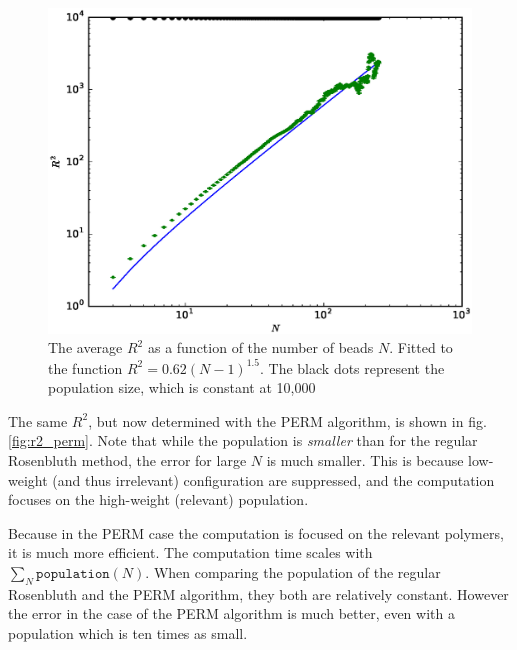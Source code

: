 \documentclass[a4paper,twocolumn]{article}
\def\code#1{\texttt{#1}}
\begin{document}
\begin{figure}
	\centering
	\includegraphics[width=\linewidth]{r2_noperm_10000run.eps}
	\caption{The average $R^2$ as a function of the number of beads $N$. Fitted to the function $R^2 = 0.62(N-1)^{1.5}$. The black dots represent the population size, which is constant at 10,000}
	\label{fig:r2_noperm}
\end{figure}

The same $R^2$, but now determined with the PERM algorithm, is shown in fig. \ref{fig:r2_perm}. Note that while the population is \emph{smaller} than for the regular Rosenbluth method, the error for large $N$ is much smaller. This is because low-weight (and thus irrelevant) configuration are suppressed, and the computation focuses on the high-weight (relevant) population.

Because in the PERM case the computation is focused on the relevant polymers, it is much more efficient. The computation time scales with $\sum_{N} \code{population}(N)$. When comparing the population of the regular Rosenbluth and the PERM algorithm, they both are relatively constant. However the error in the case of the PERM algorithm is much better, even with a population which is ten times as small.
\end{document}
